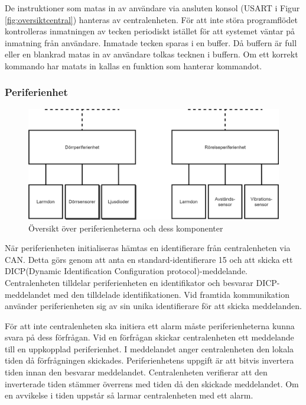 \documentclass[a4paper]{article}
\begin{document}
De instruktioner som matas in av användare via ansluten konsol (USART i Figur \ref{fig:oversiktcentral}) hanteras av centralenheten.
För att inte störa programflödet kontrolleras inmatningen av tecken periodiskt istället för att systemet väntar på inmatning från användare.
Inmatade tecken sparas i en buffer.
Då buffern är full eller en blankrad matas in av användare tolkas tecknen i buffern.
Om ett korrekt kommando har matats in kallas en funktion som hanterar kommandot.


\subsubsection{Periferienhet}
\begin{figure}[H]
    \centering
    \includegraphics[width=\textwidth]{periferi-oversikt-pp.png}
    \caption{Översikt över periferienheterna och dess komponenter}
    \label{fig:oversiktperiferi}
\end{figure}

När periferienheten initialiseras hämtas en identifierare från centralenheten via CAN.
Detta görs genom att anta en standard-identifierare 15 och att skicka ett DICP(Dynamic Identification Configuration protocol)-meddelande.
Centralenheten tilldelar periferienheten en identifikator och besvarar DICP-meddelandet med den tilldelade identifikationen.
Vid framtida kommunikation använder periferienheten sig av sin unika identifierare för att skicka meddelanden.

För att inte centralenheten ska initiera ett alarm måste periferienheterna kunna svara på dess förfrågan.
Vid en förfrågan skickar centralenheten ett meddelande till en uppkopplad periferienhet.
I meddelandet anger centralenheten den lokala tiden då förfrågningen skickades.
Periferienhetens uppgift är att bitvis invertera tiden innan den besvarar meddelandet.
Centralenheten verifierar att den inverterade tiden stämmer överrens med tiden då den skickade meddelandet.
Om en avvikelse i tiden uppstår så larmar centralenheten med ett alarm.
\end{document}
